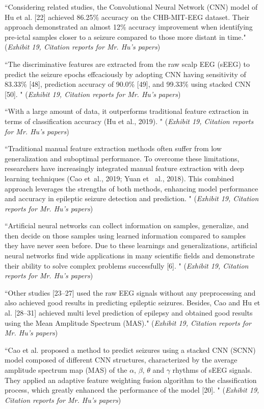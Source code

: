 \documentclass{article}
\begin{document}
“Considering related studies, the Convolutional Neural Network (CNN) model of Hu et al. [22] achieved 86.25\% accuracy on the CHB-MIT-EEG dataset. Their approach demonstrated an almost 12\% accuracy improvement when identifying pre-ictal samples closer to a seizure compared to those more distant in time." ({\it Exhibit 19, Citation reports for Mr. Hu’s papers})

“The discriminative features are extracted from the raw scalp EEG (sEEG) to predict the seizure epochs effcaciously by adopting CNN having sensitivity of 83.33\% [48], prediction accuracy of 90.0\% [49], and 99.33\% using stacked CNN [50]. " ({\it Exhibit 19, Citation reports for Mr. Hu’s papers})

“With a large amount of data, it outperforms traditional feature extraction in terms of classification accuracy (Hu et al., 2019). "  ({\it Exhibit 19, Citation reports for Mr. Hu’s papers})

“Traditional manual feature extraction methods often  suffer from low generalization and suboptimal performance. To  overcome these limitations, researchers have increasingly integrated  manual feature extraction with deep learning techniques (Cao et al.,  2019; Yuan et  al., 2018). This combined approach leverages the 
strengths of both methods, enhancing model performance and  accuracy in epileptic seizure detection and prediction. "  ({\it Exhibit 19, Citation reports for Mr. Hu’s papers})

“Artificial neural networks  can collect information on samples, generalize, and then decide on those samples using learned information compared to samples they have never seen before. Due to these learnings and generalizations, artificial neural networks find wide applications in many scientific fields and demonstrate their ability to solve complex problems successfully [6]. " ({\it Exhibit 19, Citation reports for Mr. Hu’s papers})

“Other studies [23–27] used the raw EEG signals without any preprocessing and also achieved good results in predicting epileptic seizures. Besides, Cao and Hu et al. [28–31] achieved multi level prediction of epilepsy and obtained good results using the Mean  Amplitude Spectrum (MAS)."  ({\it Exhibit 19, Citation reports for Mr. Hu’s papers})

“Cao et al. proposed a method to predict seizures using a stacked CNN (SCNN) model composed of different CNN structures, characterized by the
average amplitude spectrum map (MAS) of the $\alpha$, $\beta$, $\theta$ and $\gamma$ rhythms of sEEG signals. They applied an adaptive feature weighting fusion algorithm to the classification process, which greatly enhanced the performance of the model [20]. "   ({\it Exhibit 19, Citation reports for Mr. Hu’s papers})
\end{document}
